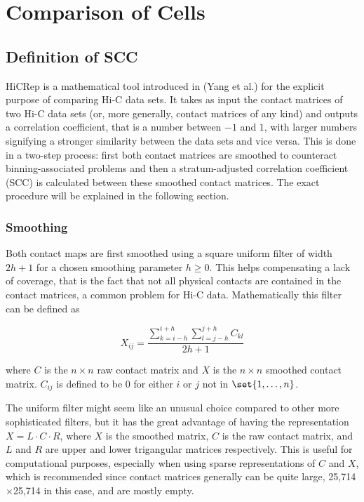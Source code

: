 
\chapter{Comparison of Cells} %
\label{cha:comparison_of_cells}

\section{Definition of SCC} %
\label{sec:definition_of_scc}

HiCRep is a mathematical tool introduced in (Yang et al.\cite{yang_hicrep_2017}) for the explicit purpose of comparing Hi-C data sets. It takes as input the contact matrices of two Hi-C data sets (or, more generally, contact matrices of any kind) and outputs a correlation coefficient, that is a number between \(-1\) and \(1\), with larger numbers signifying a stronger similarity between the data sets and vice versa. This is done in a two-step process: first both contact matrices are smoothed to counteract binning-associated problems and then a stratum-adjusted correlation coefficient (SCC) is calculated between these smoothed contact matrices. The exact procedure will be explained in the following section.

\subsection{Smoothing} %
\label{subsec:smoothing}

Both contact maps are first smoothed using a square uniform filter of width \(2h+1\) for a chosen smoothing parameter \(h \geq 0\). This helps compensating a lack of coverage, that is the fact that not all physical contacts are contained in the contact matrices, a common problem for Hi-C data. Mathematically this filter can be defined as

\[
  X_{ij} = \frac{ \sum_{k=i-h}^{i+h} \sum_{l=j-h}^{j+h} C_{kl} }{ 2h+1 }
\]

where \(C\) is the \(n \times n\) raw contact matrix and \(X\) is the \(n \times n\) smoothed contact matrix. \(C_{ij}\) is defined to be 0 for either \(i\) or \(j\) not in \(\set{1, \dots, n}\).

The uniform filter might seem like an unusual choice compared to other more sophisticated filters, but it has the great advantage of having the representation \( X = L \cdot C \cdot R \), where \(X\) is the smoothed matrix, \(C\) is the raw contact matrix, and \(L\) and \(R\) are upper and lower trigangular matrices respectively. This is useful for computational purposes, especially when using sparse representations of \(C\) and \(X\), which is recommended since contact matrices generally can be quite large, 25,714\(\times\)25,714 in this case, and are mostly empty.

